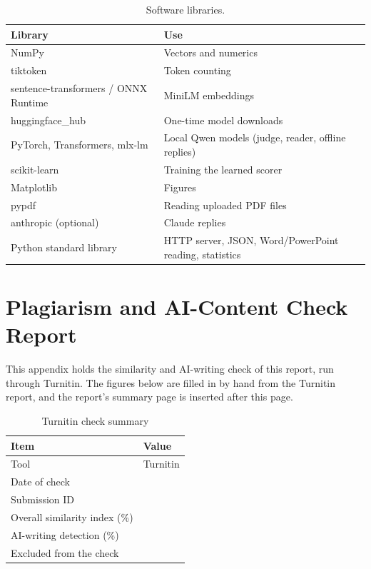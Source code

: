 \begin{table}[htbp]
\caption{Software libraries.}
\label{tab:libs}
\centering
\fontsize{9}{11}\selectfont
\begin{tabularx}{\textwidth}{@{}p{4.2cm}X@{}}
\toprule
\textbf{Library} & \textbf{Use} \\
\midrule
NumPy & Vectors and numerics \\
tiktoken & Token counting \\
sentence-transformers / ONNX Runtime & MiniLM embeddings \\
huggingface\_hub & One-time model downloads \\
PyTorch, Transformers, mlx-lm & Local Qwen models (judge, reader, offline replies) \\
scikit-learn & Training the learned scorer \\
Matplotlib & Figures \\
pypdf & Reading uploaded PDF files \\
anthropic (optional) & Claude replies \\
Python standard library & HTTP server, JSON, Word/PowerPoint reading, statistics \\
\bottomrule
\end{tabularx}
\end{table}

\chapter{Plagiarism and AI-Content Check Report}
\label{app:plag}

This appendix holds the similarity and AI-writing check of this report, run
through Turnitin. The figures below are filled in by hand from the Turnitin
report, and the report's summary page is inserted after this page.

\begin{table}[h]
\centering
\caption{Turnitin check summary}
\label{tab:plag}
\renewcommand{\arraystretch}{1.8}
\begin{tabular}{|p{6.5cm}|p{6cm}|}
\hline
\textbf{Item} & \textbf{Value} \\ \hline
Tool & Turnitin \\ \hline
Date of check & \\ \hline
Submission ID & \\ \hline
Overall similarity index (\%) & \\ \hline
AI-writing detection (\%) & \\ \hline
Excluded from the check & \\ \hline
\end{tabular}
\end{table}

